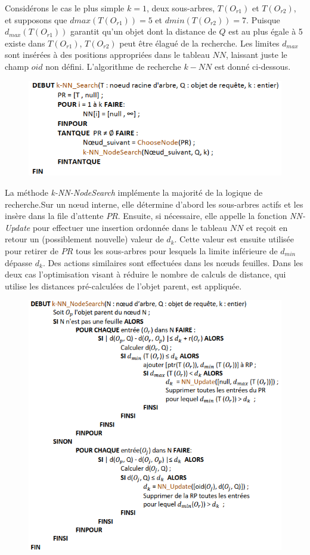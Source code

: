 Considérons le cas le plus simple $ k = 1 $, deux sous-arbres, $ T(O_{r1}) $ et $ T(O_{r2}) $, et supposons que $ dmax(T(O_{r1})) = 5 $ et $ dmin(T(O_{r2})) = 7 $. Puisque $ d_{max}(T(O_{r1})) $ garantit qu'un objet dont la distance de $  Q $ est au plus égale à 5 existe dans $ T(O_{r1}) $, $ T(O_{r2}) $ peut être élagué de la recherche. Les limites $ d_{max} $ sont insérées à des positions appropriées dans le tableau $ NN $, laissant juste le champ $ oid $ non défini. L'algorithme de recherche $ k-NN $ est donné ci-dessous.
\begin{figure}[H]
	\centering
	\includegraphics[width=.9 \textwidth]{Figures/knnsearch.png} %
\end{figure} 

La méthode \textit{k-NN-NodeSearch} implémente la majorité de la logique de recherche.Sur un nœud interne, elle détermine d'abord les sous-arbres actifs et les insère dans la file d'attente $ PR $. Ensuite, si nécessaire, elle appelle la fonction \textit{NN-Update} pour effectuer une insertion ordonnée dans le tableau $ NN $ et reçoit en retour un (possiblement nouvelle) valeur de $ d_k $. Cette valeur est ensuite utilisée pour retirer de $ PR $ tous les sous-arbres pour lesquels la limite inférieure de $ d_{min} $ dépasse $ d_{k} $. Des actions similaires sont effectuées dans les nœuds feuilles. Dans les deux cas l'optimisation visant à réduire le nombre de calculs de distance, qui utilise les distances pré-calculées de l'objet parent, est appliquée.

\begin{figure}[H]
	\centering
	\includegraphics[width=.9 \textwidth]{Figures/knnnodesearch.png} %
\end{figure} 

